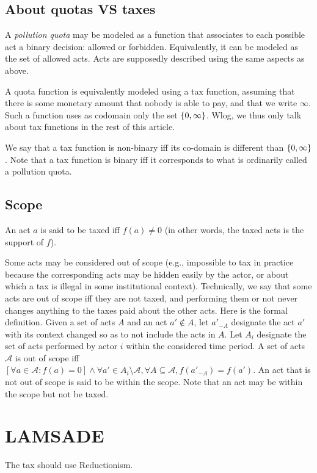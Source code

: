 \documentclass[version=3.21, pagesize, twoside=off, bibliography=totoc, DIV=calc, fontsize=12pt, a4paper, french, english]{scrartcl}
\begin{document}
\subsection{About quotas VS taxes}
A \emph{pollution quota} may be modeled as a function that associates to each possible act a binary decision: allowed or forbidden. Equivalently, it can be modeled as the set of allowed acts. Acts are supposedly described using the same aspects as above.

A quota function is equivalently modeled using a tax function, assuming that there is some monetary amount that nobody is able to pay, and that we write $\infty$. Such a function uses as codomain only the set $\{0, \infty\}$. Wlog, we thus only talk about tax functions in the rest of this article.

We say that a tax function is non-binary iff its co-domain is different than $\{0, \infty\}$. Note that a tax function is binary iff it corresponds to what is ordinarily called a pollution quota.

\subsection{Scope}
An act $a$ is said to be taxed iff $f(a) ≠ 0$ (in other words, the taxed acts is the support of $f$).

Some acts may be considered out of scope (e.g., impossible to tax in practice because the corresponding acts may be hidden easily by the actor, or about which a tax is illegal in some institutional context). Technically, we say that some acts are out of scope iff they are not taxed, and performing them or not never changes anything to the taxes paid about the other acts. Here is the formal definition. Given a set of acts $A$ and an act $a' \notin A$, let $a'_{-A}$ designate the act $a'$ with its context changed so as to not include the acts in $A$. Let $A_i$ designate the set of acts performed by actor $i$ within the considered time period. A set of acts $\mathcal{A}$ is out of scope iff $[\forall a \in \mathcal{A}: f(a) = 0] \land \forall a' \in A_i \setminus \mathcal{A}, \forall A \subseteq \mathcal{A}, f(a'_{-A}) = f(a')$.
An act that is not out of scope is said to be within the scope. Note that an act may be within the scope but not be taxed.

\section{LAMSADE}
The tax should use Reductionism.
\end{document}

